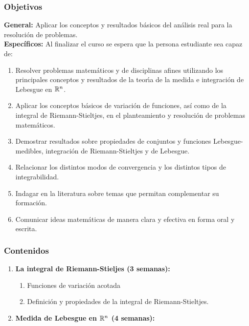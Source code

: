 \begin{refsection}
\subsubsection*{Objetivos}

\textbf{General:} Aplicar los conceptos y resultados básicos del análisis real para la resolución de problemas. \\

\textbf{Específicos:} Al finalizar el curso se espera que la persona estudiante sea capaz de:

\begin{enumerate}
\item Resolver problemas matemáticos y de disciplinas afines utilizando los principales conceptos y resultados de la teor\'{\i}a de la medida e integraci\'{o}n de Lebesgue en $\mathbb{R}^n$.
\item Aplicar los conceptos b\'asicos de variaci\'on de funciones, as\'i como de la integral de Riemann-Stieltjes, en el planteamiento y resoluci\'on de problemas matem\'aticos.
\item Demostrar resultados sobre propiedades de conjuntos y funciones Lebesgue-medibles, integración de Riemann-Stieltjes y de Lebesgue.
\item Relacionar los distintos modos de convergencia y los distintos tipos de integrabilidad.
\item Indagar en la literatura sobre temas que permitan complementar su formación.
\item Comunicar ideas matemáticas de manera clara y efectiva en forma oral y escrita.
\end{enumerate}

\newpage 

\subsubsection*{Contenidos}

\begin{enumerate}
\item \textbf{La integral de Riemann-Stieljes (3 semanas):} 
\begin{enumerate}
    \item Funciones de variación acotada
    \item Definición y propiedades de la integral de Riemann-Stieltjes.
\end{enumerate}

\item \textbf{Medida de Lebesgue en $\mathbb{R}^n$ (4 semanas):} 


\end{enumerate}
\end{refsection}
